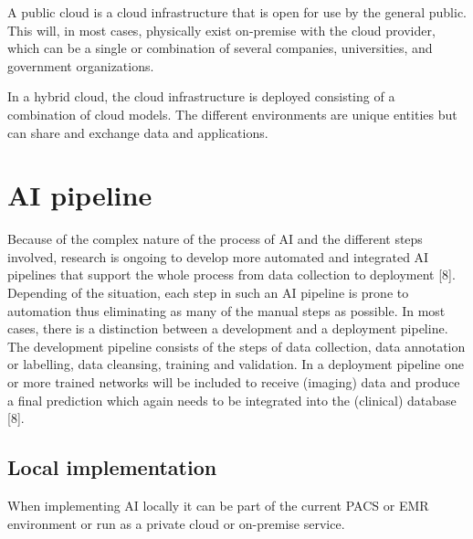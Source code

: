 A public cloud is a cloud infrastructure that is open for use by the general public. This will, in most cases, physically exist on-premise with the cloud provider, which can be a single or combination of several companies, universities, and government organizations.

In a hybrid cloud, the cloud infrastructure is deployed consisting of a combination of cloud models. The different environments are unique entities but can share and exchange data and applications.

\section{AI pipeline}





Because of the complex nature of the process of AI and the different steps involved, research is ongoing to develop more automated and integrated AI pipelines that support the whole process from data collection to deployment [8]. Depending of the situation, each step in such an AI pipeline is prone to automation thus eliminating as many of the manual steps as possible. 
In most cases, there is a distinction between a development and a deployment pipeline. The development pipeline consists of the steps of data collection, data annotation or labelling, data cleansing, training and validation. In a deployment pipeline one or more trained networks will be included to receive (imaging) data and produce a final prediction which again needs to be integrated into the (clinical) database [8].
\subsection{Local implementation}
When implementing AI locally it can be part of the current PACS or EMR environment or run as a private cloud or on-premise service.


